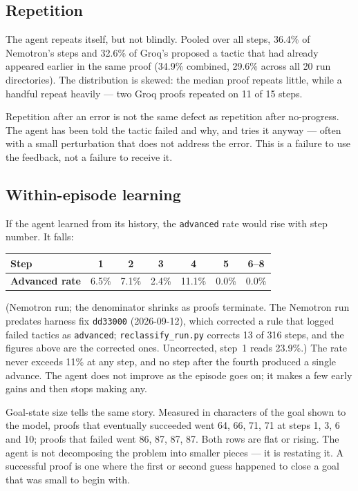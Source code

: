 \subsection{Repetition}

The agent repeats itself, but not blindly.
Pooled over all steps, 36.4\% of Nemotron's steps and 32.6\% of Groq's proposed a
tactic that had already appeared earlier in the same proof (34.9\% combined,
29.6\% across all 20 run directories).
The distribution is skewed: the median proof repeats little, while a handful
repeat heavily --- two Groq proofs repeated on 11 of 15 steps.

Repetition after an error is not the same defect as repetition after no-progress.
The agent has been told the tactic failed and why, and tries it anyway --- often
with a small perturbation that does not address the error.
This is a failure to use the feedback, not a failure to receive it.

\subsection{Within-episode learning}

If the agent learned from its history, the \texttt{advanced} rate would rise with
step number. It falls:

\begin{center}
\begin{tabular}{@{}lcccccc@{}}
\hline
\textbf{Step} & 1 & 2 & 3 & 4 & 5 & 6--8 \\
\hline
\textbf{Advanced rate} & 6.5\% & 7.1\% & 2.4\% & 11.1\% & 0.0\% & 0.0\% \\
\hline
\end{tabular}
\end{center}

\noindent (Nemotron run; the denominator shrinks as proofs terminate.
The Nemotron run predates harness fix \texttt{dd33000} (2026-09-12), which
corrected a rule that logged failed tactics as \texttt{advanced};
\texttt{reclassify\_run.py} corrects 13 of 316 steps, and the figures above are
the corrected ones. Uncorrected, step~1 reads 23.9\%.)
The rate never exceeds 11\% at any step, and no step after the fourth produced a
single advance. The agent does not improve as the episode goes on; it makes a
few early gains and then stops making any.

Goal-state size tells the same story. Measured in characters of the goal shown to
the model, proofs that eventually succeeded went 64, 66, 71, 71 at steps 1, 3, 6
and 10; proofs that failed went 86, 87, 87, 87.
Both rows are flat or rising. The agent is not decomposing the problem into
smaller pieces --- it is restating it. A successful proof is one where the first
or second guess happened to close a goal that was small to begin with.

